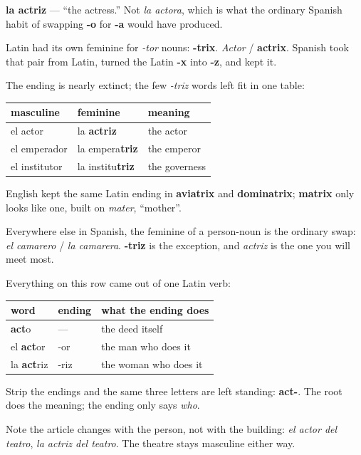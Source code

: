 \begin{cousinweb}
\textbf{la actriz} — \textquotedblleft{}the actress.\textquotedblright{} Not \emph{la actora}, which is what the ordinary Spanish habit of swapping \textbf{-o} for \textbf{-a} would have produced.

Latin had its own feminine for \emph{-tor} nouns: \textbf{-trix}. \emph{Actor} / \textbf{actrix}. Spanish took that pair from Latin, turned the Latin \textbf{-x} into \textbf{-z}, and kept it.

The ending is nearly extinct; the few \emph{-triz} words left fit in one table:

\noindent
\begin{tabularx}{\linewidth}{@{}>{\raggedright\arraybackslash}X>{\raggedright\arraybackslash}X>{\raggedright\arraybackslash}X@{}}
\toprule
\textbf{masculine} & \textbf{feminine} & \textbf{meaning} \\
\midrule
el actor & la \textbf{actriz} & the actor \\
el emperador & la empera\textbf{triz} & the emperor \\
el institutor & la institu\textbf{triz} & the governess \\
\bottomrule
\end{tabularx}

English kept the same Latin ending in \textbf{aviatrix} and \textbf{dominatrix}; \textbf{matrix} only looks like one, built on \emph{mater}, \textquotedblleft{}mother\textquotedblright{}.

Everywhere else in Spanish, the feminine of a person-noun is the ordinary swap: \emph{el camarero} / \emph{la camarera}. \textbf{-triz} is the exception, and \emph{actriz} is the one you will meet most.
\end{cousinweb}

\begin{grammarlens}[title={Grammar Lens: two words, one root, three endings}]
Everything on this row came out of one Latin verb:

\noindent
\begin{tabularx}{\linewidth}{@{}>{\raggedright\arraybackslash}X>{\raggedright\arraybackslash}X>{\raggedright\arraybackslash}X@{}}
\toprule
\textbf{word} & \textbf{ending} & \textbf{what the ending does} \\
\midrule
\textbf{act}o & — & the deed itself \\
el \textbf{act}or & -or & the man who does it \\
la \textbf{act}riz & -riz & the woman who does it \\
\bottomrule
\end{tabularx}

Strip the endings and the same three letters are left standing: \textbf{act-}. The root does the meaning; the ending only says \emph{who}.

Note the article changes with the person, not with the building: \emph{el actor del teatro}, \emph{la actriz del teatro}. The theatre stays masculine either way.
\end{grammarlens}

